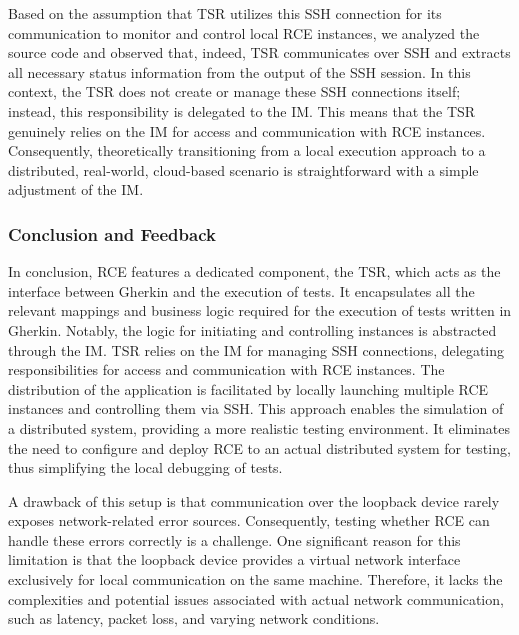 Based on the assumption that \ac{TSR} utilizes this \ac{SSH} connection for its communication to monitor and control local \ac{RCE} instances, we analyzed the source code and observed that, indeed, \ac{TSR} communicates over \ac{SSH} and extracts all necessary status information from the output of the \ac{SSH} session. In this context, the \ac{TSR} does not create or manage these \ac{SSH} connections itself; instead, this responsibility is delegated to the \ac{IM}. This means that the \ac{TSR} genuinely relies on the \ac{IM} for access and communication with \ac{RCE} instances. Consequently, theoretically transitioning from a local execution approach to a distributed, real-world, cloud-based scenario is straightforward with a simple adjustment of the \ac{IM}.

\subsubsection{Conclusion and Feedback}
In conclusion, RCE features a dedicated component, the \acf{TSR}, which acts as the interface between Gherkin and the execution of tests. It encapsulates all the relevant mappings and business logic required for the execution of tests written in Gherkin. Notably, the logic for initiating and controlling instances is abstracted through the \acf{IM}. \ac{TSR} relies on the \ac{IM} for managing \ac{SSH} connections, delegating responsibilities for access and communication with RCE instances. The distribution of the application is facilitated by locally launching multiple RCE instances and controlling them via \ac{SSH}. This approach enables the simulation of a distributed system, providing a more realistic testing environment. It eliminates the need to configure and deploy RCE to an actual distributed system for testing, thus simplifying the local debugging of tests.

A drawback of this setup is that communication over the loopback device rarely exposes network-related error sources. Consequently, testing whether RCE can handle these errors correctly is a challenge. One significant reason for this limitation is that the loopback device provides a virtual network interface exclusively for local communication on the same machine. Therefore, it lacks the complexities and potential issues associated with actual network communication, such as latency, packet loss, and varying network conditions.


